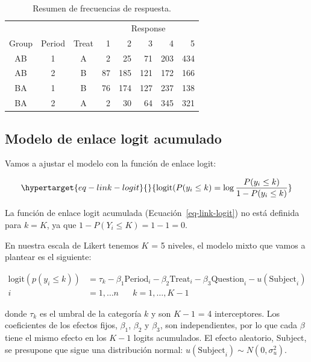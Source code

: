 \documentclass[
  letterpaper,
  DIV=11,
  numbers=noendperiod]{scrartcl}
\begin{document}
\begin{longtable}{cccrrrrr}
\caption{Resumen de frecuencias de respuesta.}\tabularnewline

\toprule
 &  &  & \multicolumn{5}{c}{Response} \\ 
\cmidrule(lr){4-8}
Group & Period & Treat & 1 & 2 & 3 & 4 & 5 \\ 
\midrule
AB & 1 & A & 2 & 25 & 71 & 203 & 434 \\ 
AB & 2 & B & 87 & 185 & 121 & 172 & 166 \\ 
BA & 1 & B & 76 & 174 & 127 & 237 & 138 \\ 
BA & 2 & A & 2 & 30 & 64 & 345 & 321 \\ 
\bottomrule
\end{longtable}

\hypertarget{modelo-de-enlace-logit-acumulado}{%
\subsection{Modelo de enlace logit
acumulado}\label{modelo-de-enlace-logit-acumulado}}

Vamos a ajustar el modelo con la función de enlace logit:

\begin{equation}\protect\hypertarget{eq-link-logit}{}{
\text{logit} (P(y_i \leq k) = \log \frac{P(y_i \leq k)}{1 - P(y_i \leq k)}
}\label{eq-link-logit}\end{equation}

La función de enlace logit acumulada (Ecuación~\ref{eq-link-logit}) no
está definida para \(k = K\), ya que \(1 - P(Y_i \leq K) = 1 - 1 = 0\).

En nuestra escala de Likert tenemos \(K\) = 5 niveles, el modelo mixto
que vamos a plantear es el siguiente:

\[
\begin{aligned}
\text{logit}(p(y_i \leq k)) &= \tau_k - \beta_1 \text{Period}_i - \beta_2 \text{Treat}_i - \beta_3 \text{Question}_i - u( \text{Subject}_i) \\
i &= 1, \dots n \; \; \; \; \; \; k = 1, \dots, K - 1
\end{aligned}
\]

donde \(\tau_k\) es el umbral de la categoría \(k\) y son \(K-1\) = 4
interceptores. Los coeficientes de los efectos fijos, \(\beta_1\),
\(\beta_2\) y \(\beta_3\), son independientes, por lo que cada \(\beta\)
tiene el mismo efecto en los \(K-1\) logits acumulados. El efecto
aleatorio, Subject, se presupone que sigue una distribución normal:
\(u(\text{Subject}_i) \sim N(0, \sigma_u^2)\).
\end{document}
